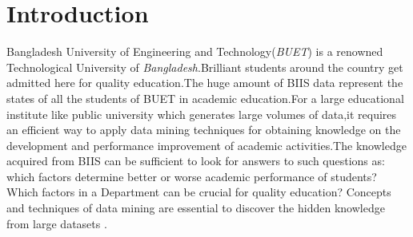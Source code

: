 \documentclass[a4paper,12pt]{book}
\begin{document}
\chapter{Introduction} %

\label{Introduction} %


\newcommand{\keyword}[1]{\textbf{#1}}
\newcommand{\tabhead}[1]{\textbf{#1}}
\newcommand{\code}[1]{\texttt{#1}}
\newcommand{\file}[1]{\texttt{\bfseries#1}}
\newcommand{\option}[1]{\texttt{\itshape#1}}



Bangladesh University of Engineering and Technology(\textit{BUET}) is a renowned Technological University of \textit{Bangladesh}.Brilliant students around the country get admitted here for quality education.The huge amount of BIIS data represent the states of all the students of BUET in academic education.For a large educational institute like public university which generates large volumes of data,it requires an efficient way to apply data mining techniques for obtaining knowledge on the development and performance improvement of academic activities.The knowledge acquired from BIIS can be sufficient to look for answers to such questions as: which factors determine better or worse academic performance of students? Which factors in a Department can be crucial for quality education? Concepts and techniques of data mining are essential to discover the hidden knowledge from large datasets \cite{concepts} .
\end{document}
